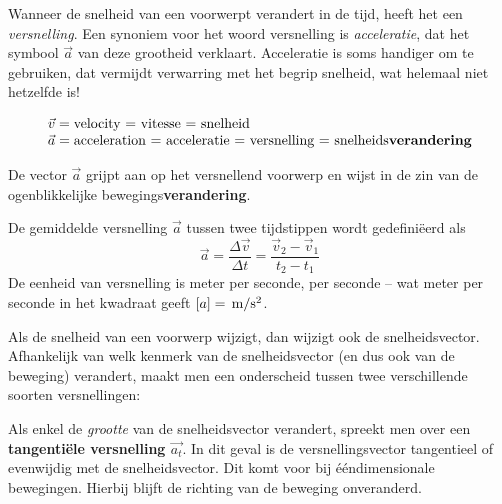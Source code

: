 \documentclass{ximera}
\begin{document}
	\author{Bart Lambregs, Vincent Gellens}
    \xmsource\xmuitleg

	
Wanneer de snelheid van een voorwerpt verandert in de tijd, heeft het een \textit{versnelling}. 
Een synoniem voor het woord versnelling is \textit{acceleratie}, dat het symbool \(\vec{a}\) van deze grootheid verklaart. 
Acceleratie is soms handiger om te gebruiken, dat vermijdt verwarring met het begrip snelheid, wat helemaal niet hetzelfde is!


\[
\begin{array}{l}
\vec{v} = \text{velocity = vitesse = snelheid} \\
\vec{a} = \text{acceleration = acceleratie = versnelling = snelheids\textbf{verandering}}
\end{array}
\]


De vector \(\vec{a}\) grijpt aan op het versnellend voorwerp en wijst in de zin van de ogenblikkelijke bewegings\textbf{verandering}.

\begin{definition}

De gemiddelde versnelling \(\vec{a}\) tussen twee tijdstippen wordt gedefiniëerd als
\[
\vec{a}=\frac{\Delta \vec{v}}{\Delta t}=\frac{\vec{v}_2-\vec{v}_1}{t_2-t_1}
\]
De eenheid van versnelling is meter per seconde, per seconde -- wat meter per seconde in het kwadraat geeft $[a]=\rm\,m/s^2$.

\end{definition}

Als de snelheid van een voorwerp wijzigt, dan wijzigt ook de snelheidsvector. 
Afhankelijk van welk kenmerk van de snelheidsvector (en dus ook van de beweging) verandert, maakt men een onderscheid tussen twee verschillende soorten versnellingen:


\begin{definition}
Als enkel de \textit{grootte} van de snelheidsvector verandert, spreekt men over een \textbf{tangentiële versnelling \(\vec{a_t}\)}. In dit geval is de versnellingsvector tangentieel of evenwijdig met de snelheidsvector. Dit komt voor bij ééndimensionale bewegingen. Hierbij blijft de richting van de beweging onveranderd.
\end{definition}
\end{document}
